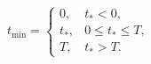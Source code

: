 \documentclass[border=2.5pt]{standalone}
\begin{document}
$\displaystyle t_{\min}=\begin{cases}0,&t_*<0,\\t_*,&0\le t_*\le T,\\T,&t_*>T.\end{cases}$
\end{document}

